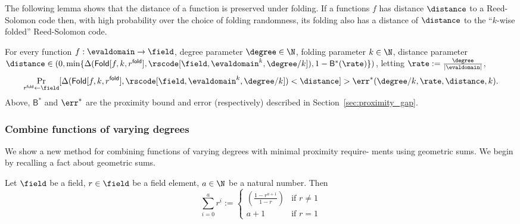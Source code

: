 The following lemma shows that the distance of a function is preserved under folding. If a functions $f$ has distance $\distance$ to a Reed-Solomon code then, with high probability over the choice of folding randomness, its folding also has a distance of $\distance$ to the ``$k$-wise folded'' Reed-Solomon code.

\begin{lemma}\label{lemma:folding}
    For every function $f:\evaldomain\rightarrow\field$, degree parameter $\degree\in\N$, folding parameter $k\in\N$, distance parameter $\distance\in(0,\min\{{\Delta(\mathsf{Fold}[f,k,r^{\mathsf{fold}}],\rscode[\field,{\evaldomain}^k, \degree/k]),1-{\mathsf{B}}^*(\rate)}\})$, letting $\rate:=\frac{\degree}{|\evaldomain|}$,
    \[
        \Pr_{r^{\mathsf{fold}}\gets\field}[\Delta(\mathsf{Fold}[f,k,r^{\mathsf{fold}}],\rscode[\field,{\evaldomain}^k, \degree/k])<\distance]>\err^*(\degree/k,\rate,\distance,k).
    \]
    Above, ${\mathsf{B}}^*$ and ${\err}^*$ are the proximity bound and error (respectively) described in Section~\ref{sec:proximity_gap}.
\end{lemma}

\subsubsection{Combine functions of varying degrees}\label{sec:combine}
We show a new method for combining functions of varying degrees with minimal proximity require- ments using geometric sums. We begin by recalling a fact about geometric sums.

\begin{lemma}\label{fact:geometric_sum}
    Let $\field$ be a field, $r\in\field$ be a field element, $a\in\N$ be a natural number. Then
    \[
    \sum_{i=0}^{a} r^i :=
    \left\{
    \begin{array}{ll}
        \displaystyle\left(\frac{1 - r^{a+1}}{1 - r}\right)
        & \text{if } r \neq 1 \\[6pt]
        a + 1
        & \text{if } r = 1
    \end{array}
    \right.
    \]

\end{lemma}

